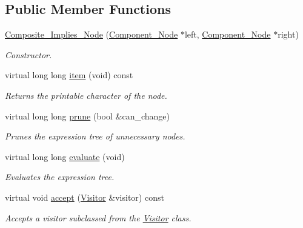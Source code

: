 \subsection*{Public Member Functions}
\begin{DoxyCompactItemize}
\item 
\hyperlink{classMadara_1_1Expression__Tree_1_1Composite__Implies__Node_a5a077357d513a560e8655d2e83866072}{Composite\_\-Implies\_\-Node} (\hyperlink{classMadara_1_1Expression__Tree_1_1Component__Node}{Component\_\-Node} $\ast$left, \hyperlink{classMadara_1_1Expression__Tree_1_1Component__Node}{Component\_\-Node} $\ast$right)
\begin{DoxyCompactList}\small\item\em Constructor. \item\end{DoxyCompactList}\item 
virtual long long \hyperlink{classMadara_1_1Expression__Tree_1_1Composite__Implies__Node_a64e1fd7f018d1471d182b04b299762fe}{item} (void) const 
\begin{DoxyCompactList}\small\item\em Returns the printable character of the node. \item\end{DoxyCompactList}\item 
virtual long long \hyperlink{classMadara_1_1Expression__Tree_1_1Composite__Implies__Node_a1619d68eb2db2be8aeed73811c775909}{prune} (bool \&can\_\-change)
\begin{DoxyCompactList}\small\item\em Prunes the expression tree of unnecessary nodes. \item\end{DoxyCompactList}\item 
virtual long long \hyperlink{classMadara_1_1Expression__Tree_1_1Composite__Implies__Node_a1d06d90048c87c24328436ab66160667}{evaluate} (void)
\begin{DoxyCompactList}\small\item\em Evaluates the expression tree. \item\end{DoxyCompactList}\item 
virtual void \hyperlink{classMadara_1_1Expression__Tree_1_1Composite__Implies__Node_ae06d733f3d3c3a5d37a1507ae0200ba9}{accept} (\hyperlink{classMadara_1_1Expression__Tree_1_1Visitor}{Visitor} \&visitor) const 
\begin{DoxyCompactList}\small\item\em Accepts a visitor subclassed from the \hyperlink{classMadara_1_1Expression__Tree_1_1Visitor}{Visitor} class. \item\end{DoxyCompactList}\item 

\end{DoxyCompactItemize}
